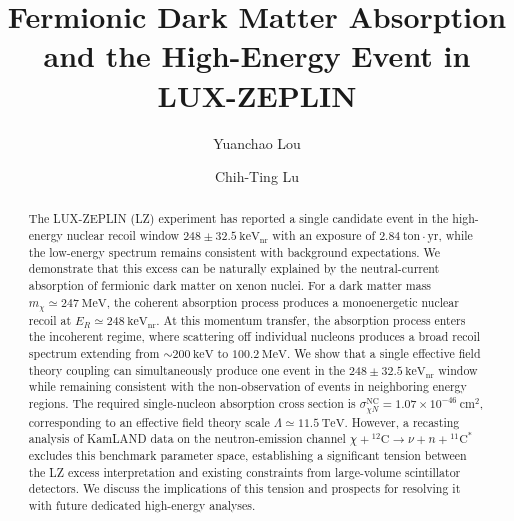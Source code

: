\documentclass[aps,twocolumn,superscriptaddress,groupedaddress,nofootinbib,floatfix]{revtex4}
\begin{document}
\title{Fermionic Dark Matter Absorption and the High-Energy Event in LUX-ZEPLIN}

\author{Yuanchao Lou}

\author{Chih-Ting Lu}


\begin{abstract}
The LUX-ZEPLIN (LZ) experiment has reported a single candidate event in the high-energy nuclear recoil window $248\pm32.5\ \mathrm{keV}_{\mathrm{nr}}$ with an exposure of $2.84\ \mathrm{ton}\cdot\mathrm{yr}$, while the low-energy spectrum remains consistent with background expectations. We demonstrate that this excess can be naturally explained by the neutral-current absorption of fermionic dark matter on xenon nuclei. For a dark matter mass $m_\chi \simeq 247\ \mathrm{MeV}$, the coherent absorption process produces a monoenergetic nuclear recoil at $E_R \simeq 248\ \mathrm{keV}_{\mathrm{nr}}$. At this momentum transfer, the absorption process enters the incoherent regime, where scattering off individual nucleons produces a broad recoil spectrum extending from $\sim 200\ \mathrm{keV}$ to $100.2\ \mathrm{MeV}$. We show that a single effective field theory coupling can simultaneously produce one event in the $248\pm32.5\ \mathrm{keV}_{\mathrm{nr}}$ window while remaining consistent with the non-observation of events in neighboring energy regions. The required single-nucleon absorption cross section is $\sigma_{\chi N}^{\mathrm{NC}} = 1.07\times10^{-46}\ \mathrm{cm}^2$, corresponding to an effective field theory scale $\Lambda \simeq 11.5\ \mathrm{TeV}$. However, a recasting analysis of KamLAND data on the neutron-emission channel $\chi+{}^{12}\mathrm{C} \to \nu + n + {}^{11}\mathrm{C}^*$ excludes this benchmark parameter space, establishing a significant tension between the LZ excess interpretation and existing constraints from large-volume scintillator detectors. We discuss the implications of this tension and prospects for resolving it with future dedicated high-energy analyses.
\end{abstract}


\maketitle
\end{document}
